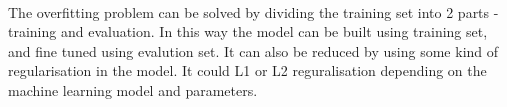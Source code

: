 \documentclass{article}
\begin{document}
\begin{multicols}{2}
\paragraph{} The overfitting problem can be solved by dividing the training set into 2 parts - training and evaluation. In this way the model can be built using training set, and fine tuned using evalution set. It can also be reduced by using some kind of regularisation in the model. It could L1 or L2 reguralisation depending on the machine learning model and parameters.
	
	 \nocite{*}
	\begingroup
	\setlength\bibitemsep{10pt}
	\printbibliography
	\endgroup
	
	\end{multicols} 
\end{document}
